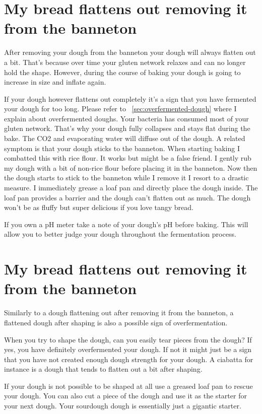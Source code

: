 \section{My bread flattens out removing it from the banneton}

After removing your dough from the banneton your dough will always
flatten out a bit. That's because over time your gluten network
relaxes and can no longer hold the shape. However, during the course
of baking your dough is going to increase in size and inflate again.

If your dough however flattens out completely it's a sign that
you have fermented your dough for too long. Please refer to ~\ref{sec:overfermented-dough}
where I explain about overfermented doughs. Your bacteria
has consumed most of your gluten network. That's why your
dough fully collapses and stays flat during the bake. The
CO2 and evaporating water will diffuse out of the dough.
A related symptom is that your dough sticks to the banneton.
When starting baking I combatted this with rice flour.
It works but might be a false friend. I gently rub my
dough with a bit of non-rice flour before placing it in
the banneton. Now then the dough starts to stick to the banneton
while I remove it I resort to a drastic measure. I immediately
grease a loaf pan and directly place the dough inside. The loaf
pan provides a barrier and the dough can't flatten out as much.
The dough won't be as fluffy but super delicious if you love tangy bread.

If you own a pH meter take a note of your dough's pH before baking.
This will allow you to better judge your dough throughout
the fermentation process.

\section{My bread flattens out removing it from the banneton}

Similarly to a dough flattening out after removing it from the banneton,
a flattened dough after shaping is also a possible sign of overfermentation.

When you try to shape the dough, can you easily tear pieces from the dough?
If yes, you have definitely overfermented your dough. If not it might just
be a sign that you have not created enough dough strength for your dough.
A ciabatta for instance is a dough that tends to flatten out a bit after shaping.

If your dough is not possible to be shaped at all use a greased loaf pan
to rescue your dough. You can also cut a piece of the dough and use it
as the starter for your next dough. Your sourdough dough is essentially
just a gigantic starter.

